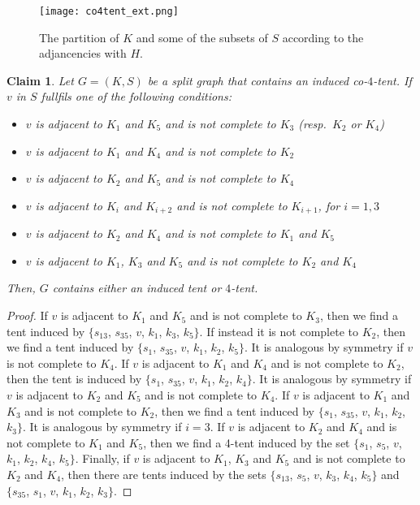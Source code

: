 \documentclass[12pt]{book}
\theoremstyle{plain}
\newtheorem{claim}[teo]{Claim}
\theoremstyle{remark}
\begin{document}
\begin{figure}[h]
	\centering
	\texttt{[image: co4tent\_ext.png]}  
	\caption{The partition of $K$ and some of the subsets of $S$ according to the adjancencies with $H$.} 	\label{fig:co4tent_ext} 
\end{figure}

\begin{claim} \label{claim:co4tent_0}
	Let $G=(K,S)$ be a split graph that contains an induced co-$4$-tent. If $v$ in $S$ fullfils one of the following conditions:
	\begin{itemize}
	\item $v$ is adjacent to $K_1$ and $K_5$ and is not complete to $K_3$ (resp.\ $K_2$ or $K_4$)
	\item $v$ is adjacent to $K_1$ and $K_4$ and is not complete to $K_2$
	\item $v$ is adjacent to $K_2$ and $K_5$ and is not complete to $K_4$ 
	\item $v$ is adjacent to $K_i$ and $K_{i+2}$ and is not complete to $K_{i+1}$, for $i=1,3$ %
	\item $v$ is adjacent to $K_2$ and $K_4$ and is not complete to $K_1$ and $K_5$
	\item $v$ is adjacent to $K_1$, $K_3$ and $K_5$ and is not complete to $K_2$ and $K_4$
	\end{itemize}
	Then, $G$ contains either an induced tent or $4$-tent.
\end{claim} 

\begin{proof}
If $v$ is adjacent to $K_1$ and $K_5$ and is not complete to $K_3$, then we find a tent induced by $\{s_{13}$, $s_{35}$, $v$, $k_1$, $k_3$, $k_5\}$. If instead it is not complete to $K_2$, then we find a tent induced by $\{s_{1}$, $s_{35}$, $v$, $k_1$, $k_2$, $k_5\}$. It is analogous by symmetry if $v$ is not complete to $K_4$.
If $v$ is adjacent to $K_1$ and $K_4$ and is not complete to $K_2$, then the tent is induced by $\{s_{1}$, $s_{35}$, $v$, $k_1$, $k_2$, $k_4\}$.
It is analogous by symmetry if $v$ is adjacent to $K_2$ and $K_5$ and is not complete to $K_4$.
If $v$ is adjacent to $K_1$ and $K_3$ and is not complete to $K_2$, then we find a tent induced by $\{s_{1}$, $s_{35}$, $v$, $k_1$, $k_2$, $k_3\}$. It is analogous by symmetry if $i=3$.
If $v$ is adjacent to $K_2$ and $K_4$ and is not complete to $K_1$ and $K_5$, then we find a 4-tent induced by the set $\{s_{1}$, $s_{5}$, $v$, $k_1$, $k_2$, $k_4$, $k_5\}$.
Finally, if $v$ is adjacent to $K_1$, $K_3$ and $K_5$ and is not complete to $K_2$ and $K_4$, then there are tents induced by the sets $\{s_{13}$, $s_{5}$, $v$, $k_3$, $k_4$, $k_5\}$ and $\{s_{35}$, $s_{1}$, $v$, $k_1$, $k_2$, $k_3 \}$. 
\end{proof}
\end{document}
